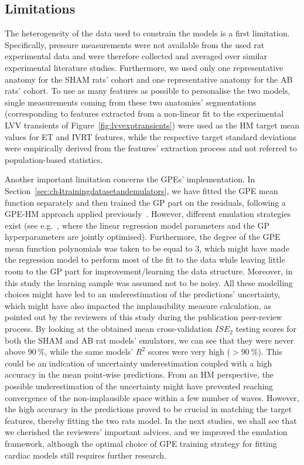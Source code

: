 \subsection{Limitations}\label{sec:ch4limitations}
The heterogeneity of the data used to constrain the models is a first limitation. Specifically, pressure measurements were not available from the used rat experimental data and were therefore collected and averaged over similar experimental literature studies. Furthermore, we used only one representative anatomy for the SHAM rats' cohort and one representative anatomy for the AB rats' cohort. To use as many features as possible to personalise the two models, single measurements coming from these two anatomies' segmentations (corresponding to features extracted from a non-linear fit to the experimental LVV transients of Figure~\ref{fig:lvvexptransients}) were used as the HM target mean values for ET and IVRT features, while the respective target standard deviations were empirically derived from the features' extraction process and not referred to population-based statistics. 

\vspace{0.2cm}
Another important limitation concerns the GPEs' implementation. In Section~\ref{sec:ch4trainingdatasetandemulators}, we have fitted the GPE mean function separately and then trained the GP part on the residuals, following a GPE-HM approach applied previously~\cite{Salter:2016,Vernon:2018}. However, different emulation strategies exist (see e.g.~\cite{Oakley:2004,Coveney:2018}, where the linear regression model parameters and the GP hyperparameters are jointly optimised). Furthermore, the degree of the GPE mean function polynomials was taken to be equal to $3$, which might have made the regression model to perform most of the fit to the data while leaving little room to the GP part for improvement/learning the data structure. Moreover, in this study the learning sample was assumed not to be noisy. All these modelling choices might have led to an underestimation of the predictions' uncertainty, which might have also impacted the implausibility measure calculation, as pointed out by the reviewers of this study during the publication peer-review process. By looking at the obtained mean cross-validation $ISE_2$ testing scores for both the SHAM and AB rat models' emulators, we can see that they were never above $\SI{90}{\percent}$, while the same models' $R^2$ scores were very high ($>\SI{90}{\percent}$). This could be an indication of uncertainty underestimation coupled with a high accuracy in the mean point-wise predictions. From an HM perspective, the possible underestimation of the uncertainty might have prevented reaching convergence of the non-implausible space within a few number of waves. However, the high accuracy in the predictions proved to be crucial in matching the target features, thereby fitting the two rats model. In the next studies, we shall see that we cherished the reviewers' important advices, and we improved the emulation framework, although the optimal choice of GPE training strategy for fitting cardiac models still requires further research.

